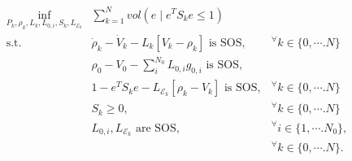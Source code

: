 \documentclass{article}
\begin{document}
\begin{equation}
\begin{array}{lll}
\inf_{P_k,\rho_k,L_k,L_{0,i},S_k,L_{\mathcal{E}_k}} & \displaystyle \sum_{k=1}^N vol(e\;|\;e^TS_ke \leq 1) &  \\
\text{s.t.} & \dot{\rho}_k - \dot{V}_k - L_k[V_k - \rho_k]\text{ is SOS}, & ^\forall k \in \{0,\cdots.N\} \\
& \rho_0 - V_0 - \displaystyle \sum_i^{N_0}L_{0,i} g_{0,i}\text{ is SOS},& \\
& 1 - e^TS_k e - L_{\mathcal{E}_k}[\rho_k - V_k]\text{ is SOS},& ^\forall k \in \{0,\cdots.N\} \\
& S_k \geq 0, & ^\forall k \in \{0,\cdots.N\} \\
& L_{0,i}, L_{\mathcal{E}_k}\text{ are SOS}, & ^\forall i \in \{1,\cdots.N_0\},\\
& &  ^\forall k \in \{0,\cdots.N\}. 
\end{array}
\nonumber
\end{equation}
\end{document}

